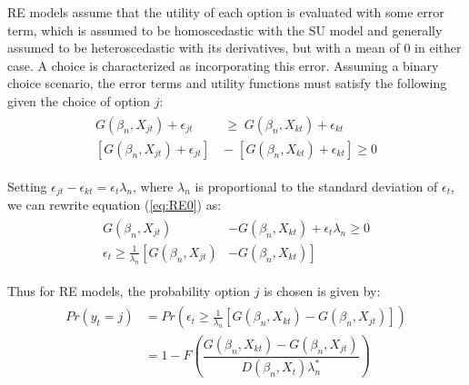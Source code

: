 \documentclass[11pt,a4paper]{article}
\newcommand\Prob{\ensuremath{\mathit{Pr}}}  %
\begin{document}
RE models assume that the utility of each option is evaluated with some error term, which is assumed to be homoscedastic with the SU model and generally assumed to be heteroscedastic with its derivatives, but with a mean of $0$ in either case.
A choice is characterized as incorporating this error.
Assuming a binary choice scenario, the error terms and utility functions must satisfy the following given the choice of option $j$:
\begin{align}
	\label{eq:RE0}
	\begin{split}
		G(\beta_n,X_{jt}) + \epsilon_{jt} \;&\geq\; G(\beta_n,X_{kt}) + \epsilon_{kt}\\
		\left[G(\beta_n,X_{jt}) + \epsilon_{jt}\right] \;&-\; \left[G(\beta_n,X_{kt}) + \epsilon_{kt}\right] \geq 0
	\end{split}
\end{align}

\noindent Setting $\epsilon_{jt} - \epsilon_{kt} = \epsilon_t\lambda_n$, where $\lambda_n$ is proportional to the standard deviation of $\epsilon_t$,{\footnotemark} we can rewrite equation (\ref{eq:RE0}) as:
\begin{align}
	\label{eq:RE1}
	\begin{split}
		G(\beta_n,X_{jt}) &- G(\beta_n,X_{kt}) + \epsilon_t\lambda_n \geq 0\\
		\epsilon_t \geq \frac{1}{\lambda_n} \left[ G(\beta_n,X_{jt}) \right.  &- \left. G(\beta_n,X_{kt}) \right]
	\end{split}
\end{align}

\addtocounter{footnote}{-1}

\noindent Thus for RE models, the probability option $j$ is chosen is given by:
\begin{align}
	\label{eq:RE.2}
	\begin{split}
	{\Prob}(y_t = j) &= {\Prob}\left(  \epsilon_t \geq \frac{1}{\lambda_n} \left[ G(\beta_n,X_{kt}) - G(\beta_n,X_{jt}) \right] \right)\\
	&= 1 - F\left( \dfrac{G(\beta_n,X_{kt}) - G(\beta_n,X_{jt})}{D(\beta_n,X_t)\lambda_n^* }  \right)
	\end{split}
\end{align}
\end{document}

